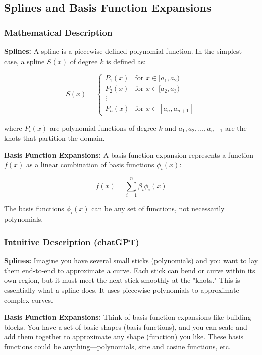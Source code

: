 \subsection{Splines and Basis Function Expansions}

\subsubsection{Mathematical Description}

\textbf{Splines:} A spline is a piecewise-defined polynomial function. In the simplest case, a spline \( S(x) \) of degree \( k \) is defined as:

\[
S(x) = \begin{cases} 
P_1(x) & \text{for } x \in [a_1, a_2) \\
P_2(x) & \text{for } x \in [a_2, a_3) \\
\vdots \\
P_n(x) & \text{for } x \in [a_n, a_{n+1}]
\end{cases}
\]

where \( P_i(x) \) are polynomial functions of degree \( k \) and \( a_1, a_2, \ldots, a_{n+1} \) are the knots that partition the domain.

\textbf{Basis Function Expansions:} A basis function expansion represents a function \( f(x) \) as a linear combination of basis functions \( \phi_i(x) \):

\[
f(x) = \sum_{i=1}^{n} \beta_i \phi_i(x)
\]

The basis functions \( \phi_i(x) \) can be any set of functions, not necessarily polynomials.

\subsubsection{Intuitive Description (chatGPT)}

\textbf{Splines:} Imagine you have several small sticks (polynomials) and you want to lay them end-to-end to approximate a curve. Each stick can bend or curve within its own region, but it must meet the next stick smoothly at the "knots." This is essentially what a spline does. It uses piecewise polynomials to approximate complex curves.

\textbf{Basis Function Expansions:} Think of basis function expansions like building blocks. You have a set of basic shapes (basis functions), and you can scale and add them together to approximate any shape (function) you like. These basis functions could be anything—polynomials, sine and cosine functions, etc.


